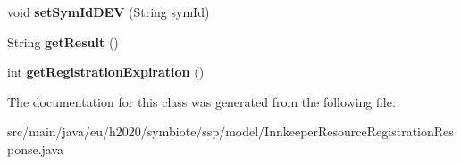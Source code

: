 \begin{DoxyCompactItemize}
void {\bfseries set\+Sym\+Id\+D\+EV} (String sym\+Id)
\item 
\mbox{\label{classeu_1_1h2020_1_1symbiote_1_1ssp_1_1model_1_1InnkeeperResourceRegistrationResponse_afda24a3711c8e7bdcef9561eac7a3441}} 
String {\bfseries get\+Result} ()
\item 
\mbox{\label{classeu_1_1h2020_1_1symbiote_1_1ssp_1_1model_1_1InnkeeperResourceRegistrationResponse_a3e9bd91a53b44ded14a4f2557cf15496}} 
int {\bfseries get\+Registration\+Expiration} ()
\end{DoxyCompactItemize}


The documentation for this class was generated from the following file\+:\begin{DoxyCompactItemize}
\item 
src/main/java/eu/h2020/symbiote/ssp/model/Innkeeper\+Resource\+Registration\+Response.\+java\end{DoxyCompactItemize}
